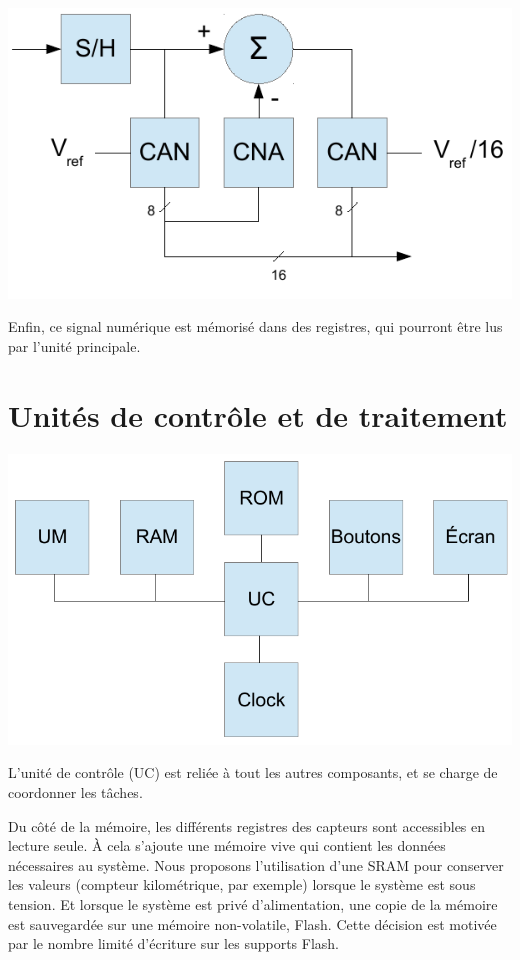 \documentclass[a4paper]{article} %
\begin{document}
\begin{center}
\includegraphics[scale=0.6]{can.pdf}
\end{center}

Enfin, ce signal numérique est mémorisé dans des registres, qui pourront être lus par l'unité principale.


\section{Unités de contrôle et de traitement}

\begin{center}
\includegraphics[scale=0.6]{uc.pdf}
\end{center}

L'unité de contrôle (UC) est reliée à tout les autres composants, et se charge de coordonner les tâches.

Du côté de la mémoire, les différents registres des capteurs sont accessibles en lecture seule.
À cela s'ajoute une mémoire vive qui contient les données nécessaires au système.
Nous proposons l'utilisation d'une SRAM pour conserver les valeurs (compteur kilométrique, par exemple) lorsque le système est sous tension.
Et lorsque le système est privé d'alimentation, une copie de la mémoire est sauvegardée sur une mémoire non-volatile, Flash.
Cette décision est motivée par le nombre limité d'écriture sur les supports Flash.
\end{document}
